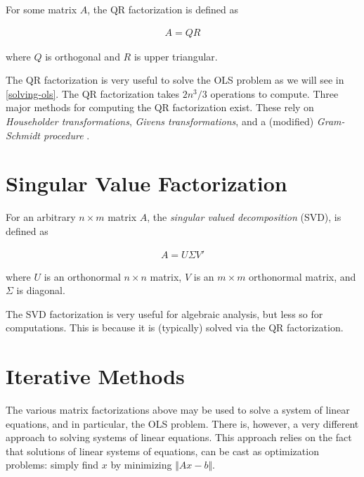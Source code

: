 \documentclass[]{book}
\theoremstyle{definition}
\theoremstyle{definition}
\theoremstyle{definition}
\theoremstyle{remark}
\let\BeginKnitrBlock\begin \let\EndKnitrBlock\end
\begin{document}
\BeginKnitrBlock{definition}[QR Factorization]
\protect\hypertarget{def:qr}{}{\label{def:qr} {} }For some matrix \(A\), the QR factorization is defined as

\begin{align}
 A = Q R 
\end{align}

where \(Q\) is orthogonal and \(R\) is upper triangular.
\EndKnitrBlock{definition}

The QR factorization is very useful to solve the OLS problem as we will
see in \ref{solving-ols}. The QR factorization takes \(2n^3/3\)
operations to compute. Three major methods for computing the QR
factorization exist. These rely on \emph{Householder transformations},
\emph{Givens transformations}, and a (modified) \emph{Gram-Schmidt
procedure} \citep{gentle2012numerical}.

\section{Singular Value
Factorization}\label{singular-value-factorization}

\BeginKnitrBlock{definition}[SVD]
\protect\hypertarget{def:svd}{}{\label{def:svd} {} }For an
arbitrary \(n\times m\) matrix \(A\), the \emph{singular valued
decomposition} (SVD), is defined as

\begin{align}
 A = U \Sigma V' 
\end{align}

where \(U\) is an orthonormal \(n \times n\) matrix, \(V\) is an
\(m \times m\) orthonormal matrix, and \(\Sigma\) is diagonal.
\EndKnitrBlock{definition}

The SVD factorization is very useful for algebraic analysis, but less so
for computations. This is because it is (typically) solved via the QR
factorization.

\section{Iterative Methods}\label{iterative-methods}

The various matrix factorizations above may be used to solve a system of
linear equations, and in particular, the OLS problem. There is, however,
a very different approach to solving systems of linear equations. This
approach relies on the fact that solutions of linear systems of
equations, can be cast as optimization problems: simply find \(x\) by
minimizing \(\Vert Ax-b \Vert\).
\end{document}

